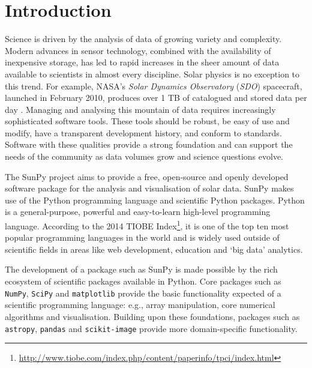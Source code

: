 \section{Introduction}\label{sec:Intro}

Science is driven by the analysis of data of growing variety and complexity.
Modern advances in sensor
technology, combined with the availability of inexpensive storage, has led to
rapid increases in the sheer amount of data available to scientists in almost
every discipline.  Solar physics is no exception to this trend. For example,
NASA's \textit{Solar Dynamics Observatory} (\textit{SDO}) spacecraft, launched in February 2010,
produces over 1 TB of catalogued and stored data per day \citep{aia}. Managing and
analysing this mountain of data
requires increasingly sophisticated software tools.
These tools should be robust, be easy of use and modify, have a
transparent development history, and conform
to standards.  Software with these qualities provide a strong
foundation and can support the needs of the community as data
volumes grow and science questions evolve.

The SunPy project aims to provide a free, open-source and openly developed software package 
for the analysis and visualisation of solar data. SunPy makes use of the Python 
programming language and scientific Python packages. Python is a general-purpose,
powerful and easy-to-learn high-level programming language.
According to the 2014 TIOBE Index\footnote{\url{http://www.tiobe.com/index.php/content/paperinfo/tpci/index.html}},
 it is one of the top ten most popular programming languages in the world 
and is widely used outside of scientific fields in areas like web development, education 
and `big data' analytics.


The development of a package such as SunPy is made possible by the 
rich ecosystem of scientific packages available in Python. Core packages such 
as \texttt{NumPy}, \texttt{SciPy} and \texttt{matplotlib} 
provide the basic functionality expected of a scientific programming language:
e.g., array manipulation, core numerical algorithms and visualisation. 
Building upon these foundations, packages such as \texttt{astropy}, \texttt{pandas} and 
\texttt{scikit-image} provide more domain-specific functionality.

